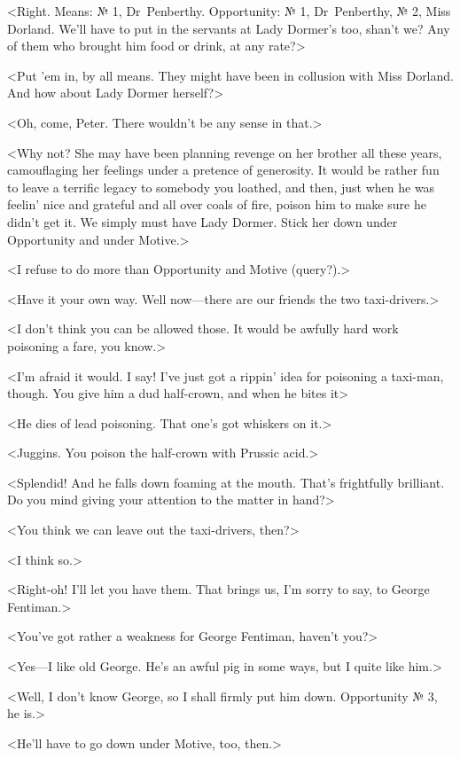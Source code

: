 <Right. Means: № 1, Dr~Penberthy. Opportunity: № 1, Dr~Penberthy, № 2, Miss Dorland. We'll have to put in the servants at Lady Dormer's too, shan't we? Any of them who brought him food or drink, at any rate?>

<Put 'em in, by all means. They might have been in collusion with Miss Dorland. And how about Lady Dormer herself?>

<Oh, come, Peter. There wouldn't be any sense in that.>

<Why not? She may have been planning revenge on her brother all these years, camouflaging her feelings under a pretence of generosity. It would be rather fun to leave a terrific legacy to somebody you loathed, and then, just when he was feelin' nice and grateful and all over coals of fire, poison him to make sure he didn't get it. We simply must have Lady Dormer. Stick her down under Opportunity and under Motive.>

<I refuse to do more than Opportunity and Motive (query?).>

<Have it your own way. Well now—there are our friends the two taxi-drivers.>

<I don't think you can be allowed those. It would be awfully hard work poisoning a fare, you know.>

<I'm afraid it would. I say! I've just got a rippin' idea for poisoning a taxi-man, though. You give him a dud half-crown, and when he bites it\longdash>

<He dies of lead poisoning. That one's got whiskers on it.>

<Juggins. You poison the half-crown with Prussic acid.>

<Splendid! And he falls down foaming at the mouth. That's frightfully brilliant. Do you mind giving your attention to the matter in hand?>

<You think we can leave out the taxi-drivers, then?>

<I think so.>

<Right-oh! I'll let you have them. That brings us, I'm sorry to say, to George Fentiman.>

<You've got rather a weakness for George Fentiman, haven't you?>

<Yes—I like old George. He's an awful pig in some ways, but I quite like him.>

<Well, I don't know George, so I shall firmly put him down. Opportunity № 3, he is.>

<He'll have to go down under Motive, too, then.>

